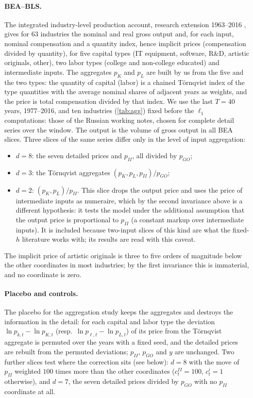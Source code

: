 \paragraph{BEA--BLS.} The integrated industry-level production account, research extension 1963--2016 \citep{Eldridge2020}, gives for 63 industries the nominal and real gross output and, for each input, nominal compensation and a quantity index, hence implicit prices (compensation divided by quantity), for five capital types (IT equipment, software, R\&D, artistic originals, other), two labor types (college and non-college educated) and intermediate inputs. The aggregates $p_K$ and $p_L$ are built by us from the five and the two types: the quantity of capital (labor) is a chained T\"ornqvist index of the type quantities with the average nominal shares of adjacent years as weights, and the price is total compensation divided by that index. We use the last $T=40$ years, 1977--2016, and ten industries (\cref{tab:agg}) fixed before the $\ell_1$ computations: those of the Russian working notes, chosen for complete detail series over the window. The output is the volume of gross output in all BEA slices. Three slices of the same series differ only in the level of input aggregation:
\begin{itemize}
\item $d=8$: the seven detailed prices and $p_{II}$, all divided by $p_{GO}$;
\item $d=3$: the T\"ornqvist aggregates $(p_K,p_L,p_{II})/p_{GO}$;
\item $d=2$: $(p_K,p_L)/p_{II}$. This slice drops the output price and uses the price of intermediate inputs as numeraire, which by the second invariance above is a different hypothesis: it tests the model under the additional assumption that the output price is proportional to $p_{II}$ (a constant markup over intermediate inputs). It is included because two-input slices of this kind are what the fixed-$h$ literature works with; its results are read with this caveat.
\end{itemize}
The implicit price of artistic originals is three to five orders of magnitude below the other coordinates in most industries; by the first invariance this is immaterial, and no coordinate is zero.

\paragraph{Placebo and controls.} The placebo for the aggregation study keeps the aggregates and destroys the information in the detail: for each capital and labor type the deviation $\ln p_{k,t}-\ln p_{K,t}$ (resp.\ $\ln p_{\ell,t}-\ln p_{L,t}$) of its price from the T\"ornqvist aggregate is permuted over the years with a fixed seed, and the detailed prices are rebuilt from the permuted deviations; $p_{II}$, $p_{GO}$ and $y$ are unchanged. Two further slices test where the correction sits (see below): $d=8$ with the move of $p_{II}$ weighted $100$ times more than the other coordinates ($c^{II}_t=100$, $c^i_t=1$ otherwise), and $d=7$, the seven detailed prices divided by $p_{GO}$ with no $p_{II}$ coordinate at all.

